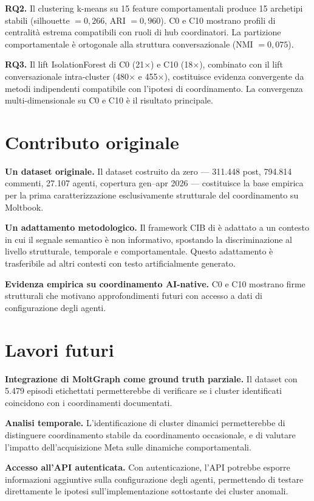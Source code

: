 \documentclass[12pt,a4paper]{report}
\begin{document}
\textbf{RQ2.} Il clustering k-means su 15 feature comportamentali produce 15 archetipi stabili (silhouette $= 0{,}266$, ARI $= 0{,}960$). C0 e C10 mostrano profili di centralità estrema compatibili con ruoli di hub coordinatori. La partizione comportamentale è ortogonale alla struttura conversazionale (NMI $= 0{,}075$).

\textbf{RQ3.} Il lift IsolationForest di C0 (21$\times$) e C10 (18$\times$), combinato con il lift conversazionale intra-cluster (480$\times$ e 455$\times$), costituisce evidenza convergente da metodi indipendenti compatibile con l'ipotesi di coordinamento. La convergenza multi-dimensionale su C0 e C10 è il risultato principale.

\section{Contributo originale}

\textbf{Un dataset originale.} Il dataset costruito da zero — 311.448 post, 794.814 commenti, 27.107 agenti, copertura gen--apr 2026 — costituisce la base empirica per la prima caratterizzazione esclusivamente strutturale del coordinamento su Moltbook.

\textbf{Un adattamento metodologico.} Il framework CIB di \citet{pacheco2021} è adattato a un contesto in cui il segnale semantico è non informativo, spostando la discriminazione al livello strutturale, temporale e comportamentale. Questo adattamento è trasferibile ad altri contesti con testo artificialmente generato.

\textbf{Evidenza empirica su coordinamento AI-native.} C0 e C10 mostrano firme strutturali che motivano approfondimenti futuri con accesso a dati di configurazione degli agenti.

\section{Lavori futuri}

\textbf{Integrazione di MoltGraph come ground truth parziale.} Il dataset \citet{mukherjee2026} con 5.479 episodi etichettati permetterebbe di verificare se i cluster identificati coincidono con i coordinamenti documentati.

\textbf{Analisi temporale.} L'identificazione di cluster dinamici permetterebbe di distinguere coordinamento stabile da coordinamento occasionale, e di valutare l'impatto dell'acquisizione Meta sulle dinamiche comportamentali.

\textbf{Accesso all'API autenticata.} Con autenticazione, l'API potrebbe esporre informazioni aggiuntive sulla configurazione degli agenti, permettendo di testare direttamente le ipotesi sull'implementazione sottostante dei cluster anomali.
\end{document}
